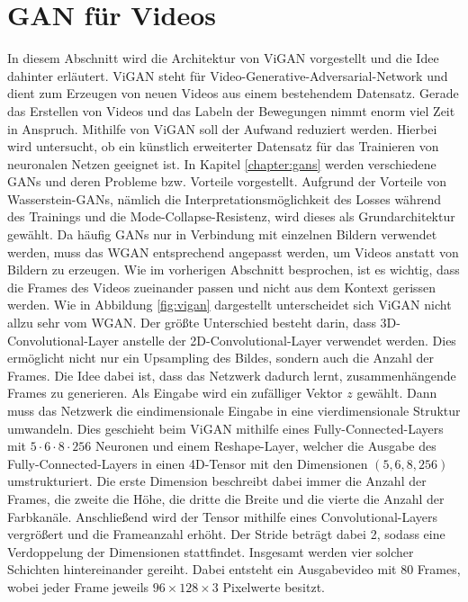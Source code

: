 \section{GAN für Videos}
In diesem Abschnitt wird die Architektur von ViGAN vorgestellt und die
Idee dahinter erläutert. ViGAN steht für Video-Generative-Adversarial-Network
und dient zum Erzeugen von neuen Videos aus einem bestehendem Datensatz. Gerade
das Erstellen von Videos und das Labeln der Bewegungen nimmt enorm viel Zeit in
Anspruch. Mithilfe von ViGAN soll der Aufwand reduziert werden. Hierbei wird
untersucht, ob ein künstlich erweiterter Datensatz für das Trainieren von
neuronalen Netzen geeignet ist. In Kapitel \ref{chapter:gans} werden
verschiedene GANs und deren Probleme bzw. Vorteile vorgestellt. Aufgrund der
Vorteile von Wasserstein-GANs, nämlich die Interpretationsmöglichkeit des Losses
während des Trainings und die Mode-Collapse-Resistenz, wird dieses als
Grundarchitektur gewählt. Da häufig GANs nur in Verbindung mit einzelnen Bildern
verwendet werden, muss das WGAN entsprechend angepasst werden, um Videos anstatt
von Bildern zu erzeugen. Wie im vorherigen Abschnitt besprochen, ist es wichtig,
dass die Frames des Videos zueinander passen und nicht aus dem Kontext gerissen
werden. Wie in Abbildung \ref{fig:vigan} dargestellt unterscheidet sich ViGAN
nicht allzu sehr vom WGAN. Der größte Unterschied besteht darin, dass
3D-Convolutional-Layer anstelle der 2D-Convolutional-Layer verwendet werden.
Dies ermöglicht nicht nur ein Upsampling des Bildes, sondern auch die Anzahl der
Frames. Die Idee dabei ist, dass das Netzwerk dadurch lernt, zusammenhängende
Frames zu generieren. Als Eingabe wird ein zufälliger Vektor $z$ gewählt. Dann
muss das Netzwerk die eindimensionale Eingabe in eine vierdimensionale Struktur
umwandeln. Dies geschieht beim ViGAN mithilfe eines Fully-Connected-Layers mit
$5 \cdot 6 \cdot 8 \cdot 256$ Neuronen und einem Reshape-Layer, welcher die
Ausgabe des Fully-Connected-Layers in einen 4D-Tensor mit den Dimensionen $(5,
6, 8, 256)$ umstrukturiert. Die erste Dimension beschreibt dabei immer die
Anzahl der Frames, die zweite die Höhe, die dritte die Breite und die vierte die
Anzahl der Farbkanäle. Anschließend wird der Tensor mithilfe eines
Convolutional-Layers vergrößert und die Frameanzahl erhöht. Der Stride beträgt
dabei 2, sodass eine Verdoppelung der Dimensionen stattfindet. Insgesamt werden
vier solcher Schichten hintereinander gereiht. Dabei entsteht ein Ausgabevideo
mit 80 Frames, wobei jeder Frame jeweils $96 \times 128 \times 3$ Pixelwerte
besitzt.

